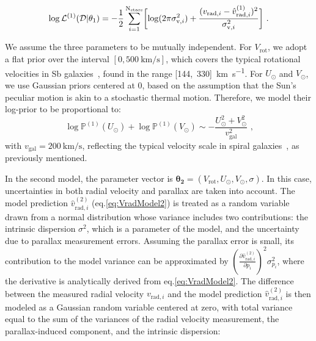\begin{equation}\label{Eq:LogLikeMod1}
    \log \mathcal{L}^{(1)}(\mathcal{D} \vert \theta_1) = -\frac{1}{2}\sum_{i=1}^{\text{N}_{\text{stars}}}\biggl[\log(2\pi\sigma_{\text{v},i}^2)+\frac{(v_{\text{rad},i} - \hat{v}_{\text{rad},i}^{(1)})^2}{\sigma_{\text{v},i}^2}\biggr] \text{ .}
\end{equation}

We assume the three parameters to be mutually independent. For $V_{\text{rot}}$, we adopt a flat prior over the interval $[0,\qty{500}{\kilo\meter\per\second}]$, which covers the typical rotational velocities in Sb galaxies~\cite{Schneider2015}, found in the range [144,~330]~\unit{\kilo\meter\per\second}\cite{Schneider2015}. For $U_\odot$ and $V_\odot$, we use Gaussian priors centered at 0, based on the assumption that the Sun's peculiar motion is akin to a stochastic thermal motion. Therefore, we model their log-prior to be proportional to:
\begin{equation*}
    \log\mathbb{P}^{(1)}(U_\odot) + \log\mathbb{P}^{(1)}(V_\odot) \sim - \frac{U_\odot^2 + V_{\odot}^2}{v_{\text{gal}}^2} \text{ ,}
\end{equation*}
\noindent
with $v_{\text{gal}} = \qty{200}{\kilo\meter\per\second}$, reflecting the typical velocity scale in spiral galaxies~\cite{Schneider2015}, as previously mentioned.

In the second model, the parameter vector is $\mathbf{\theta_2} = (V_{\text{rot}}, U_{\odot}, V_{\odot}, \sigma)$. In this case, uncertainties in both radial velocity and parallax are taken into account. 
The model prediction \(\hat{v}^{(2)}_{\text{rad}, i}\) (eq.\ref{eq:VradModel2}) is treated as a random variable drawn from a normal distribution whose variance includes two contributions: the intrinsic dispersion \(\sigma^2\), which is a parameter of the model, and the uncertainty due to parallax measurement errors.
Assuming the parallax error is small, its contribution to the model variance can be approximated by \(\left( \frac{\partial \hat{v}^{(2)}_{\text{rad}, i}}{\partial p_i} \right)^2 \sigma^2_{p_i}\), where the derivative is analytically derived from eq.\ref{eq:VradModel2}. 
The difference between the measured radial velocity \(v_{\text{rad}, i}\) and the model prediction \(\hat{v}^{(2)}_{\text{rad}, i}\) is then modeled as a Gaussian random variable centered at zero, with total variance equal to the sum of the variances of the radial velocity measurement, the parallax-induced component, and the intrinsic dispersion:

